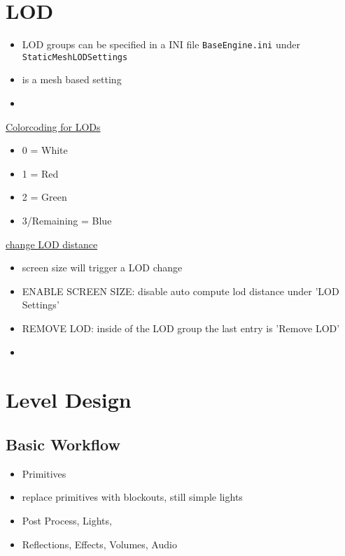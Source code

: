 \documentclass{scrbook}
\newcommand{\code}[1]{\colorbox{mygray}{\lstinline|#1|}}
\begin{document}
\smallskip

    \chapter{LOD}
        \begin{itemize}
            \item LOD groups can be specified in a INI file \code{BaseEngine.ini} under \code{StaticMeshLODSettings}
            \item is a mesh based setting
            \item 
        \end{itemize}

        \underline{Colorcoding for LODs}
        \begin{itemize}
            \item 0 = White
            \item 1 = Red
            \item 2 = Green
            \item 3/Remaining = Blue
        \end{itemize}

        \underline{change LOD distance}
        \begin{itemize}
            \item screen size will trigger a LOD change
            \item ENABLE SCREEN SIZE: disable auto compute lod distance under 'LOD Settings'
            \item REMOVE LOD: inside of the LOD group the last entry is 'Remove LOD'
            \item 
        \end{itemize}
    
    \chapter{Level Design}
        \section{Basic Workflow}    
            \begin{itemize}
                \item Primitives
                \item replace primitives with blockouts, still simple lights
                \item Post Process, Lights, 
                \item Reflections, Effects, Volumes, Audio
            \end{itemize}
\end{document}
